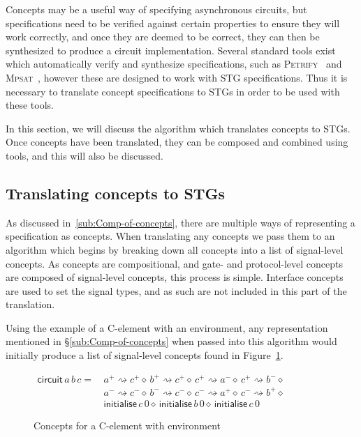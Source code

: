 \documentclass[british,compsoc]{IEEEtran}
\newcommand{\noun}[1]{\textsc{#1}}
\begin{document}
Concepts may be a useful way of specifying asynchronous circuits, but specifications need to be verified against certain properties to ensure they will work correctly, and once they are
deemed to be correct, they can then be synthesized to produce a circuit implementation. Several standard tools exist which automatically verify and synthesize specifications, such as
\noun{Petrify}~\cite{Cortadella} and \noun{Mpsat}~\cite{khomenko2004detecting}, however these are designed to work with STG specifications. Thus it is necessary to translate
concept specifications to STGs in order to be used with these tools.

In this section, we will discuss the algorithm which translates concepts to STGs. Once concepts have been translated, they can be composed and combined using tools, and this will also
be discussed.


\subsection{Translating concepts to STGs \label {sub:translating}}

As discussed in~\ref{sub:Comp-of-concepts}, there are multiple ways of representing a specification as concepts.
When translating any concepts we pass them to an algorithm which begins by breaking down all concepts into a list of
signal-level concepts. As concepts are compositional, and gate- and protocol-level concepts are composed of signal-level concepts, this process is simple.
Interface concepts are used to set the signal types, and as such are not included in this part of the translation.

Using the example of a C-element with an environment, any representation mentioned in \S\ref{sub:Comp-of-concepts} when passed into this
algorithm would initially produce a list of signal-level concepts found in Figure~\ref{fig:c-element-concepts}.

\begin{figure}[h]

\begin{center}

$\begin{aligned}\mathsf{circuit}\,a \,b \,c=& \,a^{+}\rightsquigarrow c^{+} \diamond \,b^{+}\rightsquigarrow c^{+} \diamond \,c^{+}\rightsquigarrow a^{-} \diamond \,c^{+}
\rightsquigarrow b^{-} \diamond \\
&\,a^{-}\rightsquigarrow c^{-} \diamond \,b^{-}\rightsquigarrow c^{-} \diamond \,c^{-}\rightsquigarrow a^{+} \diamond \,c^{-}\rightsquigarrow b^{+} \diamond \\
&\,\mathsf{initialise}\,c \,0 \diamond \,\mathsf{initialise}\,b \,0 \diamond \,\mathsf{initialise}\,c \, 0
\end{aligned}$

\end{center}
\caption{Concepts for a C-element with environment\label{fig:c-element-concepts}}
\end{figure}
\end{document}
